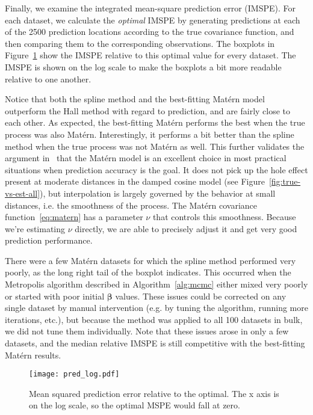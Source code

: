 Finally, we examine the integrated mean-square prediction error (IMSPE). For each dataset, we calculate the \emph{optimal} IMSPE by generating predictions at each of the 2500 prediction locations according to the true covariance function, and then comparing them to the corresponding observations. The boxplots in Figure~\ref{fig:pred-log} show the IMSPE relative to this optimal value for every dataset. The IMSPE is shown on the log scale to make the boxplots a bit more readable relative to one another.

Notice that both the spline method and the best-fitting Mat\'{e}rn model outperform the Hall method with regard to prediction, and are fairly close to each other. As expected, the best-fitting Mat\'{e}rn performs the best when the true process was also Mat\'{e}rn. Interestingly, it performs a bit better than the spline method when the true process was not Mat\'{e}rn as well. This further validates the argument in~\cite{Stein1999} that the Mat\'{e}rn model is an excellent choice in most practical situations when prediction accuracy is the goal. It does not pick up the hole effect present at moderate distances in the damped cosine model (see Figure~\ref{fig:true-vs-est-all}), but interpolation is largely governed by the behavior at small distances, i.e. the smoothness of the process. The Mat\'{e}rn covariance function~\ref{eq:matern} has a parameter $\nu$ that controls this smoothness. Because we're estimating $\nu$ directly, we are able to precisely adjust it and get very good prediction performance.

There were a few Mat\'{e}rn datasets for which the spline method performed very poorly, as the long right tail of the boxplot indicates. This occurred when the Metropolis algorithm described in Algorithm~\ref{alg:mcmc} either mixed very poorly or started with poor initial $\bm{\beta}$ values. These issues could be corrected on any single dataset by manual intervention (e.g. by tuning the algorithm, running more iterations, etc.), but because the method was applied to all 100 datasets in bulk, we did not tune them individually. Note that these issues arose in only a few datasets, and the median relative IMSPE is still competitive with the best-fitting Mat\'{e}rn results.

\begin{figure}[htbp]
	\centering
	\texttt{[image: pred\_log.pdf]}
	\caption{Mean squared prediction error relative to the optimal. The x axis is on the log scale, so the optimal MSPE would fall at zero.}
	\label{fig:pred-log}
\end{figure}

